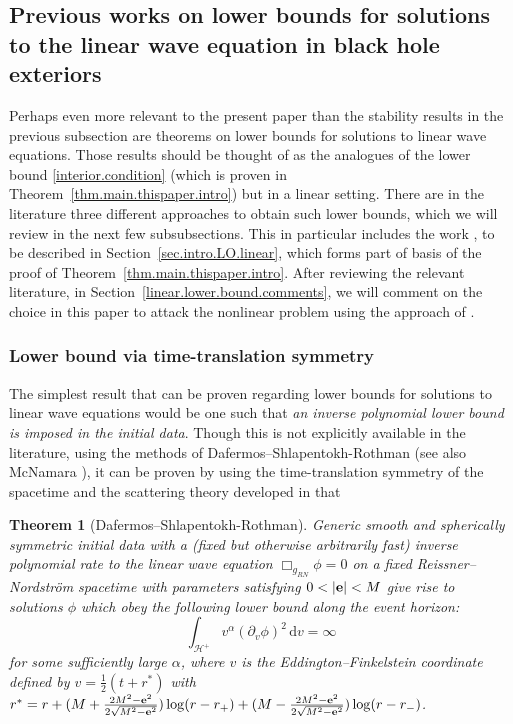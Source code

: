 \documentclass[10pt, reqno]{amsart}
\newtheorem{theorem}{Theorem}[section]
\theoremstyle{definition}
\theoremstyle{remark}
\theoremstyle{conjecture}
\numberwithin{equation}{section}
\newcommand{\ud}{\mathrm{d}}
\newcommand{\rd}{\partial}
\newcommand{\0}{\emptyset}
\newcommand{\alp}{\alpha}
\newcommand{\calH}{\mathcal H}
\newcommand{\f}{\frac}
\newcommand{\EH}{\calH^{+}}
\begin{document}
\subsection{Previous works on lower bounds for solutions to the linear wave equation in black hole exteriors}\label{sec.previous.lower.bound}

Perhaps even more relevant to the present paper than the stability results in the previous subsection are theorems on lower bounds for solutions to linear wave equations. Those results should be thought of as the analogues of the lower bound \eqref{interior.condition} (which is proven in Theorem~\ref{thm.main.thispaper.intro}) but in a linear setting. There are in the literature three different approaches to obtain such lower bounds, which we will review in the next few subsubsections. This in particular includes the work \cite{LO.instab}, to be described in Section~\ref{sec.intro.LO.linear}, which forms part of basis of the proof of Theorem~\ref{thm.main.thispaper.intro}. After reviewing the relevant literature, in Section~\ref{linear.lower.bound.comments}, we will comment on the choice in this paper to attack the nonlinear problem using the approach of \cite{LO.instab}.

\subsubsection{Lower bound via time-translation symmetry}

The simplest result that can be proven regarding lower bounds for solutions to linear wave equations would be one such that \emph{an inverse polynomial lower bound is imposed in the initial data}. Though this is not explicitly available in the literature, using the methods of Dafermos--Shlapentokh-Rothman \cite{DafShl} (see also McNamara \cite{McN}), it can be proven by using the time-translation symmetry of the spacetime and the scattering theory developed in \cite{DRSR} that 

\begin{theorem}[Dafermos--Shlapentokh-Rothman]\label{thm.McN}
Generic smooth and spherically symmetric initial data with a (fixed but otherwise arbitrarily fast) inverse polynomial rate to the linear wave equation $\Box_{g_{RN}}\phi=0$ on a fixed Reissner--Nordstr\"om spacetime with parameters satisfying $0<|{\bf e}|<M$ give rise to solutions $\phi$ which obey the following lower bound along the event horizon:
$$\int_{\EH} v^{\alp} (\rd_{v} \phi)^{2} \, \ud v = \infty$$
for some sufficiently large $\alp$, where $v$ is the Eddington--Finkelstein coordinate defined by $v=\f 12(t+r^*)$ with $r^*=r+(M+\frac{2M^2-{\bf e}^2}{2\sqrt{M^2-{\bf e}^2}})\log (r-r_+) +(M-\frac{2M^2-{\bf e}^2}{2\sqrt{M^2-{\bf e}^2}})\log (r-r_-)$.
\end{theorem}
\end{document}
